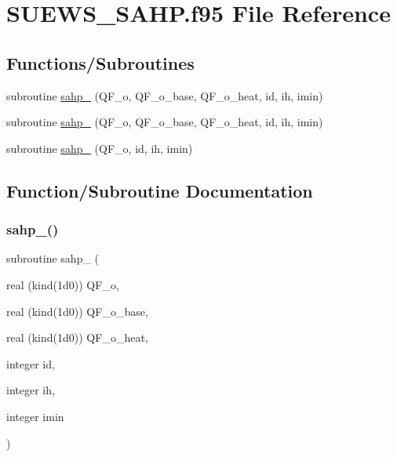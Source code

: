 \hypertarget{_s_u_e_w_s___s_a_h_p_8f95}{}\section{S\+U\+E\+W\+S\+\_\+\+S\+A\+H\+P.\+f95 File Reference}
\label{_s_u_e_w_s___s_a_h_p_8f95}
\subsection*{Functions/\+Subroutines}
\begin{DoxyCompactItemize}
\item 
subroutine \hyperlink{_s_u_e_w_s___s_a_h_p_8f95_ab568d02ff4d86576ac4294ee0d16a0d8}{sahp\+\_} (Q\+F\+\_\+o, Q\+F\+\_\+o\+\_\+base, Q\+F\+\_\+o\+\_\+heat, id, ih, imin)
\item 
subroutine \hyperlink{_s_u_e_w_s___s_a_h_p_8f95_aee8fa1098c2995bf57f8bc65e5be7ed2}{sahp\+\_} (Q\+F\+\_\+o, Q\+F\+\_\+o\+\_\+base, Q\+F\+\_\+o\+\_\+heat, id, ih, imin)
\item 
subroutine \hyperlink{_s_u_e_w_s___s_a_h_p_8f95_a2afb7b9da3c248277f05791a04feb468}{sahp\+\_} (Q\+F\+\_\+o, id, ih, imin)
\end{DoxyCompactItemize}


\subsection{Function/\+Subroutine Documentation}
\mbox{\label{_s_u_e_w_s___s_a_h_p_8f95_ab568d02ff4d86576ac4294ee0d16a0d8}} 
\subsubsection{\texorpdfstring{sahp\+\_()}{sahp\_1()}}
{\footnotesize\ttfamily subroutine sahp\+\_ (\begin{DoxyParamCaption}\item[{real (kind(1d0))}]{Q\+F\+\_\+o,  }\item[{real (kind(1d0))}]{Q\+F\+\_\+o\+\_\+base,  }\item[{real (kind(1d0))}]{Q\+F\+\_\+o\+\_\+heat,  }\item[{integer}]{id,  }\item[{integer}]{ih,  }\item[{integer}]{imin }\end{DoxyParamCaption})}




